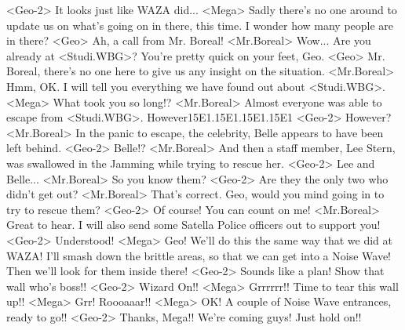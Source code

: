 <Geo-2> It looks just like WAZA did... 
<Mega> Sadly there's no one around to update us on what's going on in there, this time. 
I wonder how many people are in there? 
<Geo> Ah, a call from Mr. Boreal! 
<Mr.Boreal> Wow... Are you already at <Studi.WBG>? 
You're pretty quick on your feet, Geo. 
<Geo> Mr. Boreal, there's no one here to give us any insight on the situation. 
<Mr.Boreal> Hmm, OK. 
I will tell you everything we have found out about <Studi.WBG>. 
<Mega> What took you so long!? 
<Mr.Boreal> Almost everyone was able to escape from <Studi.WBG>. 
However{15}{E1}.{15}{E1}.{15}{E1}.{15}{E1} 
<Geo-2> However? 
<Mr.Boreal> In the panic to escape, the celebrity, Belle appears to have been left behind. 
<Geo-2> Belle!? 
<Mr.Boreal> And then a staff member, Lee Stern, was swallowed 
in the Jamming while trying to rescue her. 
<Geo-2> Lee and Belle... 
<Mr.Boreal> So you know them? 
<Geo-2> Are they the only two who didn't get out? 
<Mr.Boreal> That's correct. 
Geo, would you mind going in to try to rescue them? 
<Geo-2> Of course! You can count on me! 
<Mr.Boreal> Great to hear. 
I will also send some Satella Police officers out to support you! 
<Geo-2> Understood! 
<Mega> Geo! We'll do this the same way that we did at WAZA! 
I'll smash down the brittle areas, so that we can get into a Noise Wave! 
Then we'll look for them inside there! 
<Geo-2> Sounds like a plan! Show that wall who's boss!! 
<Geo-2> Wizard On!! 
<Mega> Grrrrrr!! 
Time to tear this wall up!! 
<Mega> Grr! Roooaaar!! 
<Mega> OK! A couple of Noise Wave entrances, ready to go!! 
<Geo-2> Thanks, Mega!! 
We're coming guys! Just hold on!! 
